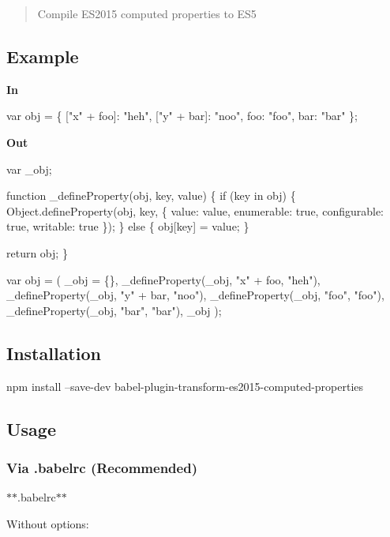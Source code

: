 \begin{quote}
Compile E\+S2015 computed properties to E\+S5 \end{quote}


\subsection*{Example}

{\bfseries In}


\begin{DoxyCode}
var obj = \{
  ["x" + foo]: "heh",
  ["y" + bar]: "noo",
  foo: "foo",
  bar: "bar"
\};
\end{DoxyCode}


{\bfseries Out}


\begin{DoxyCode}
var \_obj;

function \_defineProperty(obj, key, value) \{
  if (key in obj) \{
    Object.defineProperty(obj, key, \{
      value: value,
      enumerable: true,
      configurable: true,
      writable: true
    \});
  \} else \{
    obj[key] = value;
  \}

  return obj;
\}

var obj = (
  \_obj = \{\},
  \_defineProperty(\_obj, "x" + foo, "heh"),
  \_defineProperty(\_obj, "y" + bar, "noo"),
  \_defineProperty(\_obj, "foo", "foo"),
  \_defineProperty(\_obj, "bar", "bar"),
  \_obj
);
\end{DoxyCode}


\subsection*{Installation}


\begin{DoxyCode}
npm install --save-dev babel-plugin-transform-es2015-computed-properties
\end{DoxyCode}


\subsection*{Usage}

\subsubsection*{Via {\ttfamily .babelrc} (Recommended)}

$\ast$$\ast$.babelrc$\ast$$\ast$

Without options\+:


